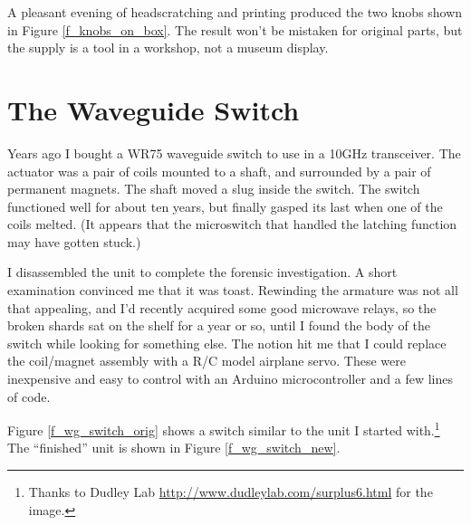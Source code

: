 \documentclass[12pt]{article}
\begin{document}
A pleasant evening of headscratching and printing produced the two knobs
shown in Figure \ref{f_knobs_on_box}.  The result won't be mistaken for
original parts, but the supply is a tool in a workshop, not a museum display. 

\section{The Waveguide Switch}

Years ago I bought a WR75 waveguide switch to use in a 10GHz transceiver.
The actuator was a pair of coils mounted to a shaft, and surrounded by
a pair of permanent magnets.  The shaft moved a slug inside the switch.
The switch functioned well for about ten years, but finally gasped its last
when one of the coils melted. (It appears that the microswitch that
handled the latching function may have gotten stuck.)

I disassembled the unit to complete the forensic investigation.  A short
examination convinced me that it was toast.  Rewinding the armature was
not all that appealing, and I'd recently acquired some good microwave relays,
so the broken shards sat on the shelf for a year or so, until I found the body
of the switch while looking for something else. The notion hit me that I
could replace the coil/magnet assembly with a R/C model airplane servo.
These were inexpensive and easy to control with an Arduino microcontroller
and a few lines of code.

Figure \ref{f_wg_switch_orig} shows a switch similar to the unit I started
with.\footnote{Thanks to Dudley Lab \url{http://www.dudleylab.com/surplus6.html} for the image.}  
The ``finished'' unit is shown in Figure \ref{f_wg_switch_new}. 
\end{document}
